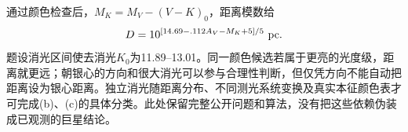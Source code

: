 \begin{solution}
通过颜色检查后，$M_K=M_V-(V-K)_0$，距离模数给
\[
 D=10^{[14.69-.112A_V-M_K+5]/5}\ {\rm pc}.
\]
题设消光区间使去消光$K_0$为11.89--13.01。同一颜色候选若属于更亮的光度级，距离就更远；朝银心的方向和很大消光可以参与合理性判断，但仅凭方向不能自动把距离设为银心距离。独立消光随距离分布、不同测光系统变换及真实本征颜色表才可完成(b)、(c)的具体分类。此处保留完整公开问题和算法，没有把这些依赖伪装成已观测的巨星结论。
\end{solution}
